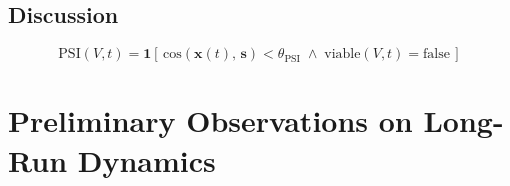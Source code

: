 \documentclass[11pt, a4paper]{article}
\newcommand{\stasis}{\bm{s}}
\newcommand{\sv}{\bm{x}}
\newcommand{\cosim}[2]{\mathrm{cos}\!\left(#1,\, #2\right)}
\newcommand{\thetaPSI}{\theta_{\mathrm{PSI}}}
\begin{document}
\subsection{Discussion}

%
%
%
%
%
\begin{equation}
  \mathrm{PSI}(V,t) = \mathbf{1}\!\left[\,
    \cosim{\sv(t)}{\stasis} < \thetaPSI
    \;\wedge\;
    \mathrm{viable}(V,t) = \mathrm{false}
  \,\right]
  \label{eq:psi}
\end{equation}

\section{Preliminary Observations on Long-Run Dynamics}
\label{sec:senescence}

%
%
%
%

\end{document}
